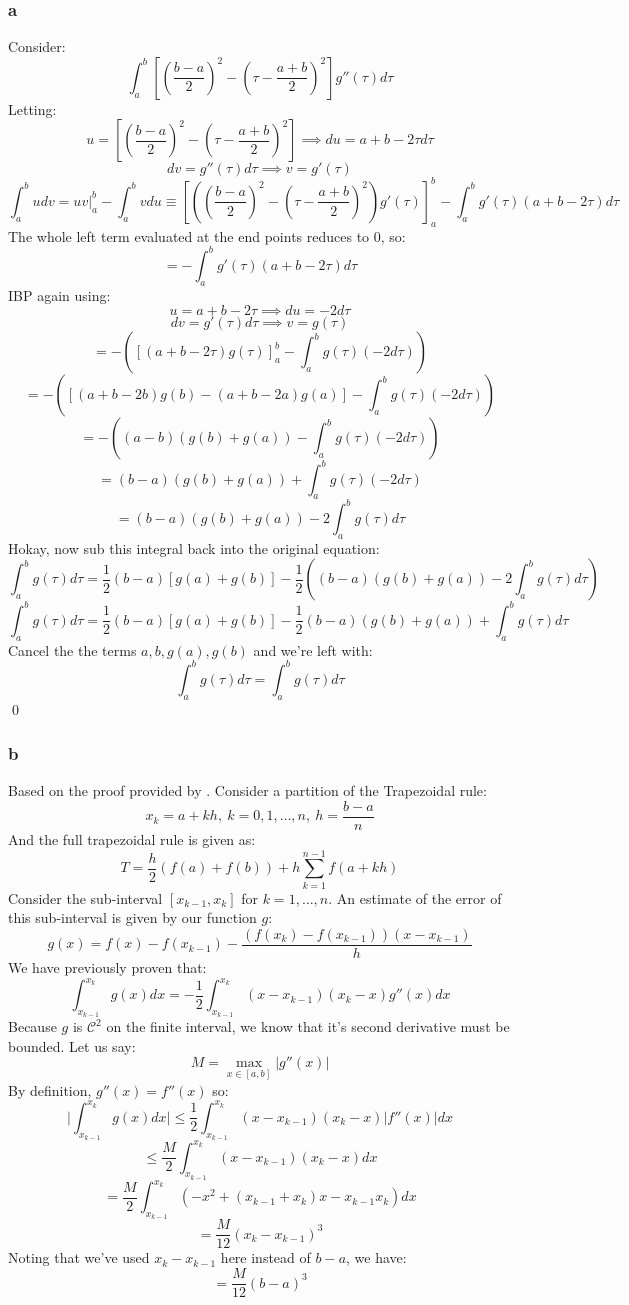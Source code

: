 \documentclass[11pt]{report}
\theoremstyle{definition}
\begin{document}
\subsubsection*{a}
Consider:
\[
	\int_{a}^{b}\left[\left(\frac{b-a}{2}\right)^2-\left(\tau-\frac{a+b}{2}\right)^2\right]g''(\tau)d\tau
\]
Letting:
\[
	u=\left[\left(\frac{b-a}{2}\right)^2-\left(\tau-\frac{a+b}{2}\right)^2\right]
	\implies du = a+b-2\tau d\tau
\]
\[
	dv=g''(\tau)d\tau \implies v = g'(\tau)
\]
\[
	\int_{a}^{b}udv = uv|_a^b-\int_{a}^{b}vdu \equiv
	\left[\left(\left(\frac{b-a}{2}\right)^2-\left(\tau-\frac{a+b}{2}\right)^2\right)
		g'(\tau)
		\right]_a^b
	-\int_{a}^{b}g'(\tau)(a+b-2\tau)d\tau
\]
The whole left term evaluated at the end points reduces to $0$, so:
\[ = -\int_{a}^{b}g'(\tau)(a+b-2\tau)d\tau \]
IBP again using:
\[u = a+b-2\tau \implies du = -2d\tau\]
\[dv = g'(\tau)d\tau \implies v=g(\tau)\]
\[ =-\left(\left[(a+b-2\tau)g(\tau)\right]_a^b - \int_{a}^{b}g(\tau)(-2d\tau)\right) \]
\[ =-\left(\left[(a+b-2b)g(b)-(a+b-2a)g(a)\right] - \int_{a}^{b}g(\tau)(-2d\tau)\right) \]
\[ = -\left((a-b)(g(b)+g(a)) - \int_{a}^{b}g(\tau)(-2d\tau)\right)\]
\[ = (b-a)(g(b)+g(a)) + \int_{a}^{b}g(\tau)(-2d\tau)\]
\[ = (b-a)(g(b)+g(a)) -2 \int_{a}^{b}g(\tau)d\tau\]
Hokay, now sub this integral back into the original equation:
\[
	\int_a^b g(\tau)d\tau = \frac{1}{2}(b-a)\left[g(a)+g(b)\right] - \frac{1}{2}\left(
	(b-a)(g(b)+g(a)) -2 \int_{a}^{b}g(\tau)d\tau
	\right)
\]
\[
	\int_a^b g(\tau)d\tau = \frac{1}{2}(b-a)\left[g(a)+g(b)\right] - \frac{1}{2}
	(b-a)(g(b)+g(a)) + \int_{a}^{b}g(\tau)d\tau
\]
Cancel the the terms $a,b,g(a),g(b)$ and we're left with:
\[\int_{a}^{b}g(\tau)d\tau = \int_{a}^{b}g(\tau)d\tau\]
\qed

\subsubsection*{b}
Based on the proof provided by \cite{Heck_Schut}.
Consider a partition of the Trapezoidal rule:
\[x_k=a+kh,\ k=0,1,\ldots,n,\ h=\frac{b-a}{n}\]
And the full trapezoidal rule is given as:
\[T = \frac{h}{2} (f(a)+f(b))+h\sum_{k=1}^{n-1}f(a+kh)\]
Consider the sub-interval $[x_{k-1}, x_k]$ for $k=1,\ldots,n$. An estimate
of the error of this sub-interval is given by our function $g$:
\[ g(x) = f(x)-f(x_{k-1})-\frac{(f(x_k)-f(x_{k-1}))(x-x_{k-1})}{h} \]
We have previously proven that:
\[\int_{x_{k-1}}^{x_k}g(x)dx = -\frac{1}{2}\int_{x_{k-1}}^{x_k}(x-x_{k-1})(x_k-x)g''(x)dx\]
Because $g$ is $\mathcal{C}^2$ on the finite interval, we know that it's second derivative
must be bounded. Let us say:
\[M = \max_{x\in[a,b]} |g''(x)|\]
By definition, $g''(x) = f''(x)$ so:
\[
	\bigg|\int_{x_{k-1}}^{x_k}g(x)dx\bigg| \leq
	\frac{1}{2}\int_{x_{k-1}}^{x_k}(x-x_{k-1})(x_k-x)|f''(x)|dx
\]
\[ \leq \frac{M}{2}\int_{x_{k-1}}^{x_k}(x-x_{k-1})(x_{k}-x)dx \]
\[ = \frac{M}{2}\int_{x_{k-1}}^{x_k} (-x^2+(x_{k-1}+x_k)x-x_{k-1}x_k) dx \]
\[=\frac{M}{12}(x_k-x_{k-1})^3\]
Noting that we've used $x_k-x_{k-1}$ here instead of $b-a$, we have:
\[=\frac{M}{12}(b-a)^3\]
\end{document}
